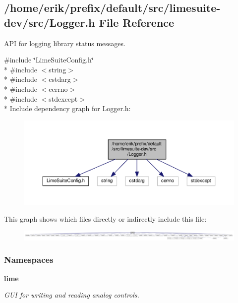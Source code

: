 \subsection{/home/erik/prefix/default/src/limesuite-\/dev/src/\+Logger.h File Reference}
\label{Logger_8h}


A\+PI for logging library status messages.  


{\ttfamily \#include \char`\"{}Lime\+Suite\+Config.\+h\char`\"{}}\\*
{\ttfamily \#include $<$string$>$}\\*
{\ttfamily \#include $<$cstdarg$>$}\\*
{\ttfamily \#include $<$cerrno$>$}\\*
{\ttfamily \#include $<$stdexcept$>$}\\*
Include dependency graph for Logger.\+h\+:
\nopagebreak
\begin{figure}[H]
\begin{center}
\leavevmode
\includegraphics[width=350pt]{d5/df4/Logger_8h__incl}
\end{center}
\end{figure}
This graph shows which files directly or indirectly include this file\+:
\nopagebreak
\begin{figure}[H]
\begin{center}
\leavevmode
\includegraphics[width=350pt]{da/d2c/Logger_8h__dep__incl}
\end{center}
\end{figure}
\subsubsection*{Namespaces}
\begin{DoxyCompactItemize}
\item 
 {\bf lime}
\begin{DoxyCompactList}\small\item\em G\+UI for writing and reading analog controls. \end{DoxyCompactList}\end{DoxyCompactItemize}
